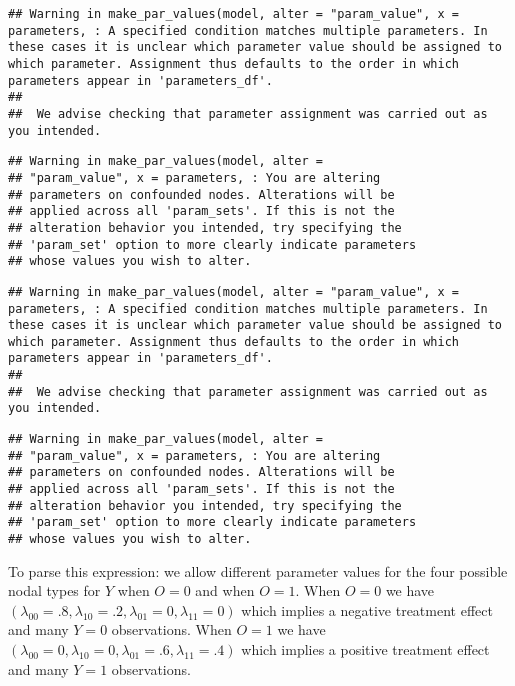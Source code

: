 \documentclass[
  12pt,
]{book}
\begin{document}
\begin{verbatim}
## Warning in make_par_values(model, alter = "param_value", x = parameters, : A specified condition matches multiple parameters. In these cases it is unclear which parameter value should be assigned to which parameter. Assignment thus defaults to the order in which parameters appear in 'parameters_df'.
##               
##  We advise checking that parameter assignment was carried out as you intended.
\end{verbatim}

\begin{verbatim}
## Warning in make_par_values(model, alter =
## "param_value", x = parameters, : You are altering
## parameters on confounded nodes. Alterations will be
## applied across all 'param_sets'. If this is not the
## alteration behavior you intended, try specifying the
## 'param_set' option to more clearly indicate parameters
## whose values you wish to alter.
\end{verbatim}

\begin{verbatim}
## Warning in make_par_values(model, alter = "param_value", x = parameters, : A specified condition matches multiple parameters. In these cases it is unclear which parameter value should be assigned to which parameter. Assignment thus defaults to the order in which parameters appear in 'parameters_df'.
##               
##  We advise checking that parameter assignment was carried out as you intended.
\end{verbatim}

\begin{verbatim}
## Warning in make_par_values(model, alter =
## "param_value", x = parameters, : You are altering
## parameters on confounded nodes. Alterations will be
## applied across all 'param_sets'. If this is not the
## alteration behavior you intended, try specifying the
## 'param_set' option to more clearly indicate parameters
## whose values you wish to alter.
\end{verbatim}

To parse this expression: we allow different parameter values for the four possible nodal types for \(Y\) when \(O=0\) and when \(O=1\). When \(O=0\) we have \((\lambda_{00} = .8, \lambda_{10} = .2, \lambda_{01} = 0, \lambda_{11} = 0)\) which implies a negative treatment effect and many \(Y=0\) observations. When \(O=1\) we have \((\lambda_{00} = 0, \lambda_{10} = 0, \lambda_{01} = .6, \lambda_{11} = .4)\) which implies a positive treatment effect and many \(Y=1\) observations.
\end{document}
